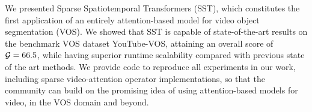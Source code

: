 We presented Sparse Spatiotemporal Transformers (SST), which constitutes the
first application of an entirely attention-based model for video object
segmentation (VOS).
We showed that SST is capable of state-of-the-art results on the benchmark VOS
dataset YouTube-VOS, attaining an overall score of~$\mathcal{G} = 66.5$,
while having superior runtime scalability compared with previous state of the
art methods.
We provide code to reproduce all experiments in our work, including sparse
video-attention operator implementations, so that the community can build on
the promising idea of using attention-based models for video, in the VOS domain
and beyond.

